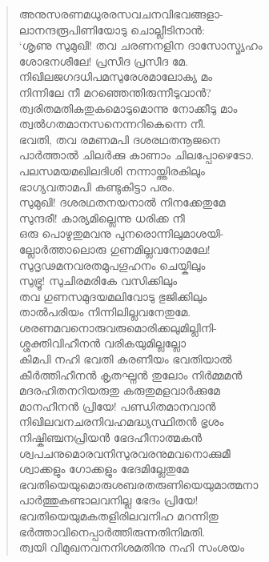 \begin{verse}
അനുസരണമധുരരസവചനവിഭവങ്ങളാ-\\
ലാനന്ദരൂപിണിയോടു ചൊല്ലീടിനാന്‍:\\
‘ശൃണു സുമുഖി! തവ ചരണനളിന ദാസോസ്മ്യഹം\\
ശോഭനശീലേ! പ്രസീദ പ്രസീദ മേ.\\
നിഖിലജഗദധിപമസുരേശമാലോക്യ മം\\
നിന്നിലേ നീ മറഞ്ഞെന്തിരുന്നീടുവാന്‍?\\
ത്വരിതമതികുതുകമൊടുമൊന്നു നോക്കീടു മാം\\
ത്വല്‍ഗതമാനസനെന്നറികെന്നെ നീ.\\
ഭവതി, തവ രമണമപി ദശരഥതനൂജനെ\\
പാര്‍ത്താല്‍ ചിലര്‍ക്കു കാണാം ചിലപ്പോഴെടോ.\\
പലസമയമഖിലദിശി നന്നായ്ത്തിരകിലും\\
ഭാഗ്യവതാമപി കണ്ടുകിട്ടാ പരം.\\
സുമുഖി! ദശരഥതനയനാല്‍ നിനക്കേതുമേ\\
സുന്ദരീ! കാര്യമില്ലെന്നു ധരിക്ക നീ\\
ഒരു പൊഴുതുമവനു പുനരൊന്നിലുമാശയി-\\
ല്ലോര്‍ത്താലൊരു ഗുണമില്ലവനോമലേ!\\
സുദൃഢമനവരതമുപഗൂഹനം ചെയ്കിലും\\
സുഭ്രൂ! സുചിരമരികേ വസിക്കിലും\\
തവ ഗുണസമുദയമലിവോടു ഭുജിക്കിലും\\
താല്‍പരിയം നിന്നിലില്ലവനേതുമേ.\\
ശരണമവനൊരുവരുമൊരിക്കലുമില്ലിനി-\\
ശ്ശക്തിവിഹീനന്‍ വരികയുമില്ലല്ലോ\\
കിമപി നഹി ഭവതി കരണീയം ഭവതിയാല്‍\\
കീര്‍ത്തിഹീനന്‍ കൃതഘ്നന്‍ തുലോം നിര്‍മ്മമന്‍\\
മദരഹിതനറിയരുതു കരുതുമളവാര്‍ക്കുമേ\\
മാനഹീനന്‍ പ്രിയേ! പണ്ഡിതമാനവാന്‍\\
നിഖിലവനചരനിവഹമദ്ധ്യസ്ഥിതന്‍ ഭൃശം\\
നിഷ്കിഞ്ചനപ്രിയന്‍ ഭേദഹീനാത്മകന്‍\\
ശ്വപചനുമൊരവനിസുരവരനുമവനൊക്കുമീ\\
ശ്വാക്കളും ഗോക്കളും ഭേദമില്ലേതുമേ\\
ഭവതിയെയുമൊരുശബരതരുണിയെയുമാത്മനാ\\
പാര്‍ത്തുകണ്ടാലവനില്ല ഭേദം പ്രിയേ!\\
ഭവതിയെയുമകതളിരിലവനിഹ മറന്നിതു\\
ഭര്‍ത്താവിനെപ്പാര്‍ത്തിരുന്നതിനിമതി.\\
ത്വയി വിമുഖനവനനിശമതിനു നഹി സംശയം\\

\end{verse}
